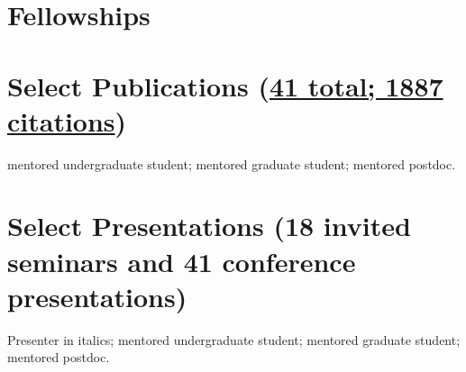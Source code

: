 \section*{Fellowships}


\section*{Select Publications (\href{https://scholar.google.com/citations?user=lz3wj6AAAAAJ&hl=en}{41 total; 1887 citations})}
\ugsymbol{}mentored undergraduate student;
\phdsymbol{}mentored graduate student;
\postdocsymbol{}mentored postdoc.

\nocite{*}
\printbibliography[filter=resumepapers, heading=none]

\section*{Select Presentations (18 invited seminars and 41 conference presentations)}
Presenter in italics;
\ugsymbol{}mentored undergraduate student;
\phdsymbol{}mentored graduate student;
\postdocsymbol{}mentored postdoc.

\nocite{*}
\printbibliography[filter=highlightedpresentations, heading=none]

